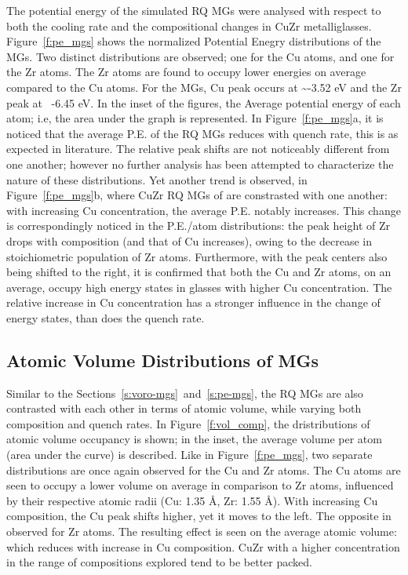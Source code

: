 The potential energy of the simulated RQ MGs were analysed with respect to both the cooling rate and the compositional changes in CuZr metalliglasses. Figure~\ref{f:pe_mgs} shows the normalized Potential Enegry distributions of the MGs. Two distinct distributions are observed; one for the Cu atoms, and one for the Zr atoms. The Zr atoms are found to occupy lower energies on average compared to the Cu atoms. For the \cz {} MGs, Cu peak occurs at \sim-3.52 eV and the Zr peak at ~-6.45 eV. In the inset of the figures, the Average potential energy of each atom; i.e, the area under the graph is represented. In Figure~\ref{f:pe_mgs}a, it is noticed that the average P.E. of the RQ MGs reduces with quench rate, this is as expected in literature. The relative peak shifts are not noticeably different from one another; however no further analysis has been attempted to characterize the nature of these distributions. Yet another trend is observed, in Figure~\ref{f:pe_mgs}b, where CuZr RQ MGs of  are constrasted with one another: with increasing Cu concentration, the average P.E. notably increases. This change is correspondingly noticed in the P.E./atom distributions: the peak height of Zr drops with composition (and that of Cu increases), owing to the decrease in stoichiometric population of Zr atoms. Furthermore, with the peak centers also being shifted to the right, it is confirmed that both the Cu and Zr atoms, on an average, occupy high energy states in glasses with higher Cu concentration. The relative increase in Cu concentration has a stronger influence in the change of energy states, than does the quench rate. \par

\subsection{Atomic Volume Distributions of MGs}  \label{s:vol-mgs}
Similar to the Sections~\ref{s:voro-mgs}~and~\ref{s:pe-mgs}, the RQ MGs are also contrasted with each other in terms of atomic volume, while varying both composition and quench rates. In Figure~\ref{f:vol_comp}, the dristributions of atomic volume occupancy is shown; in the inset, the average volume per atom (area under the curve) is described. Like in Figure~\ref{f:pe_mgs}, two separate distributions are once again observed for the Cu and Zr atoms. The Cu atoms are seen to occupy a lower volume on average in comparison to Zr atoms, influenced by their respective atomic radii (Cu: 1.35 \r{A}, Zr: 1.55 \r{A}). With increasing Cu composition, the Cu peak shifts higher, yet it moves to the left. The opposite in observed for Zr atoms. The resulting effect is seen on the average atomic volume: which reduces with increase in Cu composition. CuZr with a higher concentration in the range of compositions explored tend to be better packed. \par


